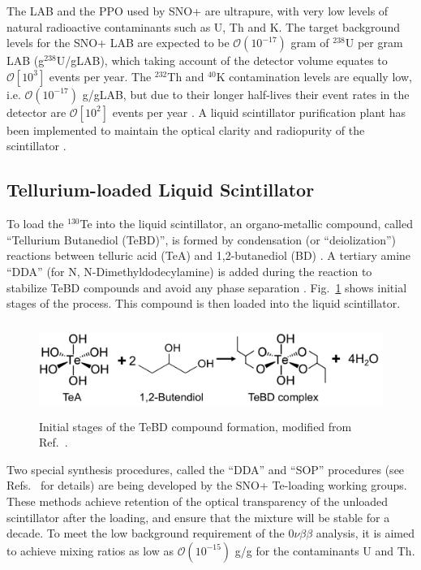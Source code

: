 The LAB and the PPO used by SNO+ are ultrapure, with very low levels of natural radioactive contaminants such as U, Th and K. The target background levels for the SNO+ LAB are expected to be $\mathcal O(10^{-17})$ gram of $^{238}$U per gram LAB (g$^{238}$U/gLAB), which taking account of the detector volume equates to $\mathcal{O}\left[10^3\right]$ events per year. The $^{232}$Th and $^{40}$K contamination levels are equally low, i.e. $\mathcal O(10^{-17})$ g/gLAB, but due to their longer half-lives their event rates in the detector are $\mathcal{O}\left[10^2\right]$ events per year \cite{snop_jinst,markchen_bkg}. A liquid scintillator purification plant has been implemented to maintain the optical clarity and radiopurity of the scintillator \cite{snop_jinst}.

\subsection{Tellurium-loaded Liquid Scintillator}\label{sect:TeLS_SNO+}

To load the $^{130}$Te into the liquid scintillator, an organo-metallic compound, called ``Tellurium Butanediol (TeBD)'', is formed by condensation (or ``deiolization'') reactions between telluric acid (TeA) and 1,2-butanediol (BD) \cite{Paton:2019kgy}. A tertiary amine ``DDA'' (for N, N-Dimethyldodecylamine) is added during the reaction to stabilize TeBD compounds and avoid any phase separation \cite{teLoadingPaper}. Fig.~\ref{fig:paton_te} shows initial stages of the process. This compound is then loaded into the liquid scintillator.
\begin{figure}[!htb]
	\centering
	\includegraphics[height = 3cm]{TeBD_process.png}
	\caption[Initial stages of the TeBD compound formation.]{Initial stages of the TeBD compound formation, modified from Ref.~\cite{Paton:2019kgy}.}
	\label{fig:paton_te}
\end{figure}

Two special synthesis procedures, called the ``DDA'' and ``SOP'' procedures (see Refs.~\cite{biller2017new,teDDA,DDAvsSOP} for details) are being developed by the SNO+ Te-loading working groups. These methods achieve retention of the optical transparency of the unloaded scintillator after the loading, and ensure that the mixture will be stable for a decade. To meet the low background requirement of the $0\nu\beta\beta$ analysis, it is aimed to achieve mixing ratios as low as $\mathcal{O}(10^{-15})$ g/g for the contaminants U and Th.

